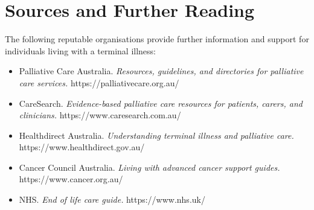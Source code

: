 \section*{Sources and Further Reading}
The following reputable organisations provide further information and support for individuals living with a terminal illness:
\begin{itemize}
    \item Palliative Care Australia. \textit{Resources, guidelines, and directories for palliative care services.} https://palliativecare.org.au/
    \item CareSearch. \textit{Evidence-based palliative care resources for patients, carers, and clinicians.} https://www.caresearch.com.au/
    \item Healthdirect Australia. \textit{Understanding terminal illness and palliative care.} https://www.healthdirect.gov.au/
    \item Cancer Council Australia. \textit{Living with advanced cancer support guides.} https://www.cancer.org.au/
    \item NHS. \textit{End of life care guide.} https://www.nhs.uk/
\end{itemize}
